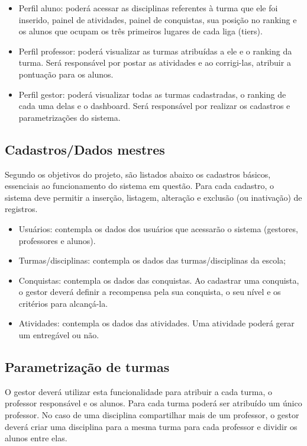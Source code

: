 \begin{itemize}
\item Perfil aluno: poderá acessar as disciplinas referentes à turma que ele foi inserido, painel de atividades, painel de conquistas, sua posição no ranking e os alunos que ocupam os três primeiros lugares de cada liga (tiers).
\item Perfil professor: poderá visualizar as turmas atribuídas a ele e o ranking da turma. Será responsável por postar as atividades e ao corrigi-las, atribuir a pontuação para os alunos.
\item Perfil gestor: poderá visualizar todas as turmas cadastradas, o ranking de cada uma delas e o dashboard. Será responsável por realizar os cadastros e parametrizações do sistema.
\end{itemize}

\subsection{Cadastros/Dados mestres}
Segundo os objetivos do projeto, são listados abaixo os cadastros básicos, essenciais ao funcionamento do sistema em questão. Para cada cadastro, o sistema deve permitir a inserção, listagem, alteração e exclusão (ou inativação) de registros. 
\begin{itemize}
\item Usuários: contempla os dados dos usuários que acessarão o sistema (gestores, professores e alunos).
\item Turmas/disciplinas: contempla os dados das turmas/disciplinas da escola;
\item Conquistas: contempla os dados das conquistas. Ao cadastrar uma conquista, o gestor deverá definir a recompensa pela sua conquista, o seu nível e os critérios para alcançá-la.
\item Atividades: contempla os dados das atividades. Uma atividade poderá gerar um entregável ou não.
\end{itemize}

\subsection{Parametrização de turmas}
O gestor deverá utilizar esta funcionalidade para atribuir a cada turma, o professor responsável e os alunos. Para cada turma poderá ser atribuído um único professor. No caso de uma disciplina compartilhar mais de um professor, o gestor deverá criar uma disciplina para a mesma turma para cada professor e dividir os alunos entre elas. 
